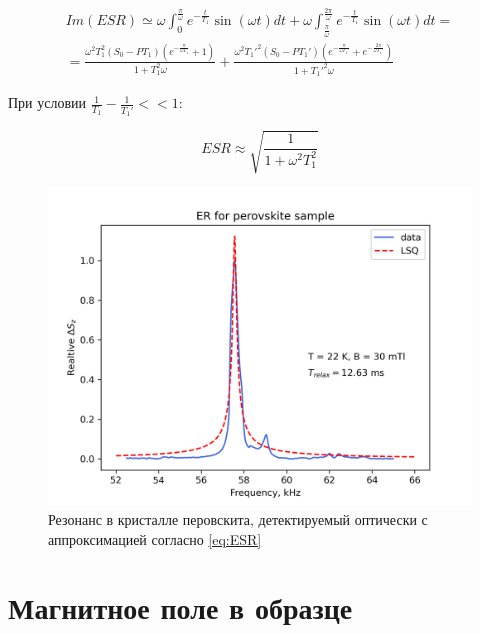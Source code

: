 \documentclass[10pt]{article}
\begin{document}
\begin{eqnarray}\label{eq:ESRsin}
\\
Im(ESR) \simeq \omega\int_{0}^{\frac{\pi}{\omega}} e^{-\frac{t}{T_1}} \sin(\omega t)dt + \omega \int_{\frac{\pi}{\omega}}^{\frac{2 \pi}{\omega}} e^{-\frac{t}{T_1}} \sin(\omega t)dt = \\
= \frac{\omega^2 T_1^2 \left( S_0 - PT_1 \right)  \left( e^{-\frac{\pi}{\omega T_1}} + 1 \right) }{1 + T_1^2 \omega} + \frac{\omega^2 T_1'^2 \left( S_0 - PT_1' \right)  \left( e^{-\frac{\pi}{\omega T_1'}} + e^{-\frac{2 \pi}{\omega T_1'}} \right) }{1 + T_1'^2 \omega} 
\end{eqnarray}
\normalsize

При условии $\frac{1}{T_1} - \frac{1}{T_1'} << 1$:

\begin{equation}\label{eq:ESR}
ESR \approx \sqrt{\frac{1}{1 + \omega^2 T_1^2}}
\end{equation}

\begin{figure}[h!]
	\centering
	\includegraphics[scale = 0.55]{ESR.png}
	\caption{Резонанс в кристалле перовскита, детектируемый оптически с аппроксимацией согласно \eqref{eq:ESR}}
	\label{fig:resonance}
\end{figure}

\newpage

\section{Магнитное поле в образце}
\end{document}
